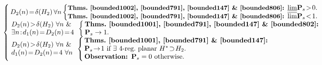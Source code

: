\documentclass{article}
\newtheorem{Proof of Theorem}{Proof of Theorem}
\begin{document}
$\left\{ \begin{array}{l}
\!\!D_{2}(n) \!=\! \delta(H_{2})~\!\forall n \left\{ \begin{array}{l}
\!\!\!
\textrm{\small{\textbf{Thms.~\ref{bounded1002},~\ref{bounded791},~\ref{bounded147} \&~\ref{bounded806}: }}}
\underline{\lim} \mathbf{P}_{s} \!>\!0. \\
\!\!\!
\textrm{\small{\textbf{Thms.~\ref{bounded1002},~\ref{bounded791},~\ref{bounded147} \&~\ref{bounded806}: }}}
\overline{\lim} \mathbf{P}_{s} \!<\!1. \\
\end{array} \right. \\
\begin{array}{l}
\!\!\!\!D_{2}(n)\!>\!\delta(H_{2})~\forall n~\&\\
\!\!\!\!\exists
\begin{picture}(0.2,1)
\put(-0.7,-0.2){\line(1,3){0.5}}
\end{picture}
n\!:\!d_{1}(n)\!=\!D_{2}(n)\!=\!4 
\end{array}
\left\{ \begin{array}{l}
\!\!\textrm{\textbf{Thms.~\ref{bounded1001},~\ref{bounded791},~\ref{bounded147} 
\&~\ref{bounded802}: }} \\
\!\!\mathbf{P}_{s} \to 1. 
\end{array} \right. \\
\begin{array}{l}
\!\!\!\!D_{2}(n)\!>\!\delta(H_{2})~\forall n~\&\\
\!\!\!\!d_{1}(n)\!=\!D_{2}(n)\!=\!4~\forall n 
\end{array}
\left\{ \begin{array}{l}
\!\!\textrm{\textbf{Thms.~\ref{bounded1001},~\ref{bounded791} \&~\ref{bounded147}: }} \\
\!\!\mathbf{P}_{s} \!\to\! 1 \textrm{ if } \exists \textrm{ $4$-reg.~planar } H^{*} \!\supset\! H_{2}. \\ 
\!\!\textrm{\textbf{Observation: }} 
\mathbf{P}_{s}=0 \textrm{ otherwise.} \\
\end{array} \right. 
\end{array} \right. $ 
\label{sum2}
\end{document}
